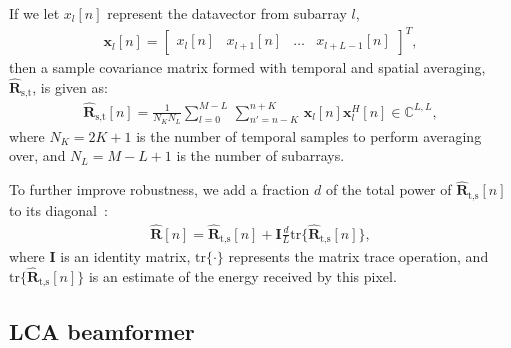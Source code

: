 \documentclass[
a4paper,10pt
]{common/ica2013_2}
\newcommand\bmat[1]{\begin{bmatrix}#1\end{bmatrix}}
\newcommand\tr{\text{tr}}
\newcommand\sumb[2]{\sum\limits_{#1}^{#2}\,}
\newcommand\T{^{\scriptscriptstyle T}}
\renewcommand\H{^{\scriptscriptstyle H}}
\renewcommand\vec[1]{\boldsymbol{#1}}
\newcommand\mat[1]{\boldsymbol{#1}}
\newcommand\1{\vec 1}
\newcommand\I{\mat I}
\newcommand*\x{\vec x}
\newcommand*\eR{\mat{\hat R}}
\begin{document}
If we let $x_l[n]$ represent the datavector from subarray $l$,
\begin{gather}
\x_l[n] = \bmat{x_l[n] & x_{l+1}[n] & \dots & x_{l+L-1}[n]}\T,
\end{gather}
then a sample covariance matrix formed with temporal and spatial averaging, $\eR_\text{s,t}$, is given as:
\begin{gather}
\eR_\text{s,t}[n] =  \frac{1}{N_K N_L} \sumb{l=0}{M-L}\sumb{n'=n-K}{n+K} \x_l[n]\x_l\H[n] \in\mathbb{C}^{L,L},\label{spatialR}
\end{gather}
where $N_K = 2K+1$ is the number of temporal samples to perform averaging over, and $N_L = M-L+1$ is the number of subarrays.

To further improve robustness, we add a fraction $d$ of the total power of $\eR_\text{t,s}[n]$ to its diagonal~\cite{Synnevag2007}:
\begin{align}
\eR[n] = \eR_\text{t,s}[n] + \I \frac{d}{L} \tr\{\eR_\text{t,s}[n]\},\label{finalR}
\end{align}
where $\I$ is an identity matrix, $\tr\{\cdot\}$ represents the matrix trace operation, and $\tr\{\eR_\text{t,s}[n]\}$ is an estimate of the energy received by this pixel.

\subsection{LCA beamformer}
\end{document}
